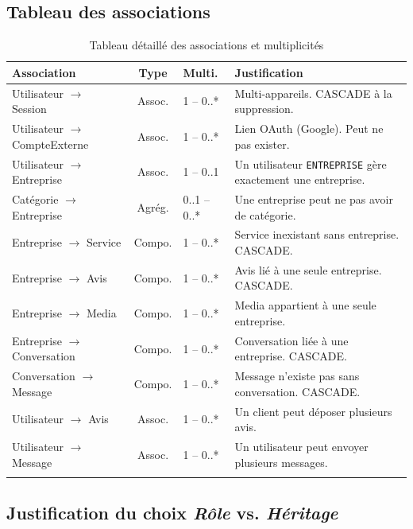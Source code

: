 \documentclass[12pt,a4paper]{article}
\begin{document}
\subsection{Tableau des associations}

\begin{longtable}{p{4cm}cp{2cm}p{5.5cm}}
\toprule
\textbf{Association} & \textbf{Type} & \textbf{Multi.} & \textbf{Justification} \\
\midrule
\endhead
Utilisateur $\rightarrow$ Session & Assoc. & 1 -- 0..* & Multi-appareils. CASCADE à la suppression. \\
Utilisateur $\rightarrow$ CompteExterne & Assoc. & 1 -- 0..* & Lien OAuth (Google). Peut ne pas exister. \\
Utilisateur $\rightarrow$ Entreprise & Assoc. & 1 -- 0..1 & Un utilisateur \texttt{ENTREPRISE} gère exactement une entreprise. \\
Catégorie $\rightarrow$ Entreprise & Agrég. & 0..1 -- 0..* & Une entreprise peut ne pas avoir de catégorie. \\
Entreprise $\rightarrow$ Service & Compo. & 1 -- 0..* & Service inexistant sans entreprise. CASCADE. \\
Entreprise $\rightarrow$ Avis & Compo. & 1 -- 0..* & Avis lié à une seule entreprise. CASCADE. \\
Entreprise $\rightarrow$ Media & Compo. & 1 -- 0..* & Media appartient à une seule entreprise. \\
Entreprise $\rightarrow$ Conversation & Compo. & 1 -- 0..* & Conversation liée à une entreprise. CASCADE. \\
Conversation $\rightarrow$ Message & Compo. & 1 -- 0..* & Message n'existe pas sans conversation. CASCADE. \\
Utilisateur $\rightarrow$ Avis & Assoc. & 1 -- 0..* & Un client peut déposer plusieurs avis. \\
Utilisateur $\rightarrow$ Message & Assoc. & 1 -- 0..* & Un utilisateur peut envoyer plusieurs messages. \\
\bottomrule
\caption{Tableau détaillé des associations et multiplicités}
\end{longtable}

\subsection{Justification du choix \textit{Rôle} vs. \textit{Héritage}}
\end{document}
